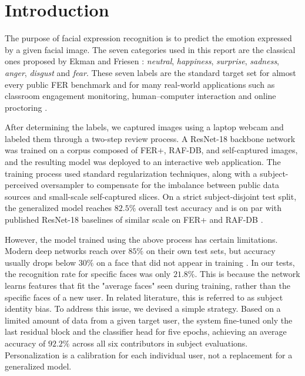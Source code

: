 \documentclass[12pt,a4paper]{article}
\begin{document}
\section{Introduction}
\label{sec:intro}

The purpose of facial expression recognition is to predict the emotion expressed by a given facial image. The seven categories used in this report are the
classical ones proposed by
Ekman and Friesen \autocite{ekman1971constants}:
\emph{neutral}, \emph{happiness}, \emph{surprise},
\emph{sadness}, \emph{anger}, \emph{disgust} and \emph{fear}.
These seven labels are the standard target set for almost
every public FER benchmark and for many real-world applications
such as classroom engagement monitoring, human--computer
interaction and online proctoring
\autocite{savchenko2022hsemotion}.

After determining the labels, we captured images using a laptop webcam and labeled them through a two-step review process. A ResNet-18 backbone network was trained on a corpus composed of FER+, RAF-DB, and self-captured images, and the resulting model was deployed to an interactive web application. The training process used standard regularization techniques, along with a subject-perceived oversampler to compensate for the imbalance between public data sources and small-scale self-captured slices. On a strict subject-disjoint test split, the generalized model reaches $82.5\%$ overall test accuracy and is on par with
published ResNet-18 baselines of similar scale on FER+ and
RAF-DB \autocite{barsoum2016ferplus, li2019rafdb}.

However, the model trained using the above process has certain limitations. Modern deep networks reach over
$85\%$ on their own test sets, but accuracy usually drops
below $30\%$ on a face that did not appear in training
\autocite{chen2021agra}. In our tests, the recognition rate for specific faces was only $21.8\%$. This is because the network learns features that fit the "average faces" seen during training, rather than the specific faces of a new user. In related literature, this is referred to as subject identity bias. To address this issue, we devised a simple strategy. Based on a limited amount of data from a given target user, the system fine-tuned only the last residual block and the classifier head for five epochs, achieving an average accuracy of $92.2\%$ across all six contributors in subject evaluations. Personalization is a calibration for each individual user, not a replacement for a generalized model.
\end{document}
